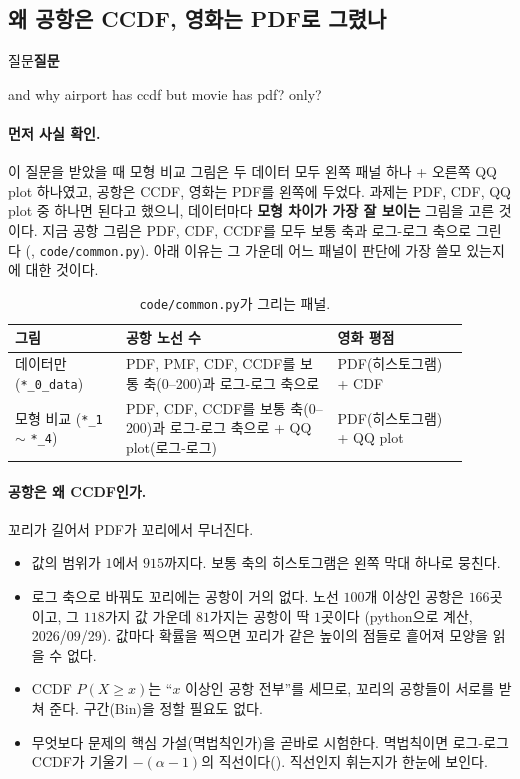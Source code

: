 \documentclass[11pt]{article}
\newenvironment{callout}[1][]
  {\par\medskip\noindent
   \begin{lrbox}{\calloutbox}\begin{minipage}{0.92\linewidth}
   \def\calloutttl{#1}\ifx\calloutttl\empty\else\textbf{#1}\par\smallskip\fi}
  {\end{minipage}\end{lrbox}%
   \fcolorbox{black!30}{black!3}{\usebox{\calloutbox}}\par\medskip}
\newcommand{\term}[1]{\textbf{#1}}
\begin{document}
\subsection{왜 공항은 CCDF, 영화는 PDF로 그렸나}
\label{sec:ccdf-vs-pdf}

\begin{callout}[질문]
and why airport has ccdf but movie has pdf? only?
\end{callout}

\paragraph{먼저 사실 확인.} 이 질문을 받았을 때 모형 비교 그림은 두 데이터 모두 왼쪽 패널
하나 + 오른쪽 QQ plot 하나였고, 공항은 CCDF, 영화는 PDF를 왼쪽에 두었다. 과제는 PDF, CDF,
QQ plot 중 하나면 된다고 했으니, 데이터마다 \term{모형 차이가 가장 잘 보이는} 그림을 고른
것이다. 지금 공항 그림은 PDF, CDF, CCDF를 모두 보통 축과 로그-로그 축으로 그린다
(, \texttt{code/common.py}). 아래 이유는 그 가운데 어느 패널이 판단에
가장 쓸모 있는지에 대한 것이다.

\begin{table}[H]
  \centering
  \caption{\texttt{code/common.py}가 그리는 패널.}
  \label{tab:panels}
  \begin{tabular}{p{0.22\linewidth}p{0.42\linewidth}p{0.26\linewidth}}
    \toprule
    그림 & 공항 노선 수 & 영화 평점 \\
    \midrule
    데이터만 (\texttt{*\_0\_data}) & PDF, PMF, CDF, CCDF를 보통 축(0--200)과 로그-로그 축으로 & PDF(히스토그램) + CDF \\
    \midrule
    모형 비교 (\texttt{*\_1} $\sim$ \texttt{*\_4}) & PDF, CDF, CCDF를 보통 축(0--200)과 로그-로그 축으로 + QQ plot(로그-로그) & PDF(히스토그램) + QQ plot \\
    \bottomrule
  \end{tabular}
\end{table}

\paragraph{공항은 왜 CCDF인가.} 꼬리가 길어서 PDF가 꼬리에서 무너진다.
\begin{itemize}
  \item 값의 범위가 $1$에서 $915$까지다. 보통 축의 히스토그램은 왼쪽 막대 하나로 뭉친다.
  \item 로그 축으로 바꿔도 꼬리에는 공항이 거의 없다. 노선 $100$개 이상인 공항은
        $166$곳이고, 그 $118$가지 값 가운데 $81$가지는 공항이 딱 $1$곳이다
        (python으로 계산, 2026/09/29). 값마다 확률을 찍으면 꼬리가 같은 높이의 점들로
        흩어져 모양을 읽을 수 없다.
  \item CCDF $P(X \ge x)$는 ``$x$ 이상인 공항 전부''를 세므로, 꼬리의 공항들이
        서로를 받쳐 준다. 구간(Bin)을 정할 필요도 없다.
  \item 무엇보다 문제의 핵심 가설(멱법칙인가)을 곧바로 시험한다. 멱법칙이면 로그-로그
        CCDF가 기울기 $-(\alpha-1)$의 직선이다(). 직선인지 휘는지가
        한눈에 보인다.
\end{itemize}
\end{document}
